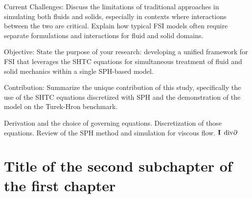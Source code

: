     Current Challenges: Discuss the limitations of traditional approaches in simulating both fluids and solids,
    especially in contexts where interactions between the two are critical. Explain how typical FSI models often require
     separate formulations and interactions for fluid and solid domains.

    Objective: State the purpose of your research: developing a unified framework for FSI that leverages the SHTC
    equations for simultaneous treatment of fluid and solid mechanics within a single SPH-based model.

    Contribution: Summarize the unique contribution of this study, specifically the use of the SHTC
    equations discretized with SPH and the demonstration of the model on the Turek-Hron benchmark.



Derivation and the choice of governing equations. Discretization of those equations.
Review of the SPH method and simulation for viscous flow. 
$\mathbf{I}$
$\mathrm{div} \partial$
\section{Title of the second subchapter of the first chapter}
